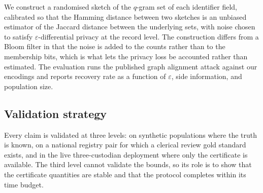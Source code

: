 We construct a randomised sketch of the $q$-gram set of each identifier field, calibrated so that
the Hamming distance between two sketches is an unbiased estimator of the Jaccard distance between
the underlying sets, with noise chosen to satisfy $\varepsilon$-differential privacy at the record
level. The construction differs from a Bloom filter in that the noise is added to the counts rather
than to the membership bits, which is what lets the privacy loss be accounted rather than
estimated. The evaluation runs the published graph alignment attack against our encodings and
reports recovery rate as a function of $\varepsilon$, side information, and population size.

\subsection{Validation strategy}

Every claim is validated at three levels: on synthetic populations where the truth is known, on a
national registry pair for which a clerical review gold standard exists, and in the live
three-custodian deployment where only the certificate is available. The third level cannot validate
the bounds, so its role is to show that the certificate quantities are stable and that the protocol
completes within its time budget.
